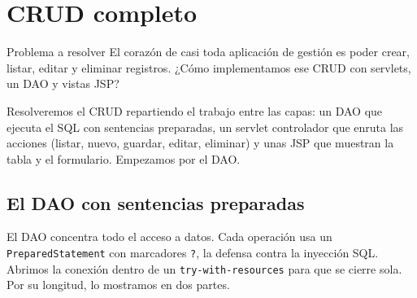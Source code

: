 \documentclass[11pt]{article}
\begin{document}
\section{CRUD completo}
\begin{cajaproblema}{Problema a resolver}
El corazón de casi toda aplicación de gestión es poder crear, listar, editar y eliminar registros. ¿Cómo implementamos ese CRUD con servlets, un DAO y vistas JSP?\par
\end{cajaproblema}
Resolveremos el CRUD repartiendo el trabajo entre las capas: un DAO que ejecuta el SQL con sentencias preparadas, un servlet controlador que enruta las acciones (listar, nuevo, guardar, editar, eliminar) y unas JSP que muestran la tabla y el formulario. Empezamos por el DAO.

\subsection{El DAO con sentencias preparadas}
El DAO concentra todo el acceso a datos. Cada operación usa un \texttt{Prepared\allowbreak{}Statement} con marcadores \texttt{?\allowbreak{}}, la defensa contra la inyección SQL. Abrimos la conexión dentro de un \texttt{try-with-resources} para que se cierre sola. Por su longitud, lo mostramos en dos partes.
\end{document}
